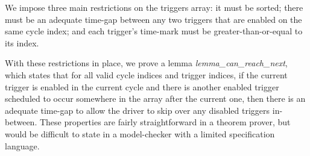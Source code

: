 
We impose three main restrictions on the triggers array: it must be sorted; there must be an adequate time-gap between any two triggers that are enabled on the same cycle index; and each trigger's time-mark must be greater-than-or-equal to its index.

With these restrictions in place, we prove a lemma \emph{lemma_can_reach_next}, which states that for all valid cycle indices and trigger indices, if the current trigger is enabled in the current cycle and there is another enabled trigger scheduled to occur somewhere in the array after the current one, then there is an adequate time-gap to allow the driver to skip over any disabled triggers in-between.
These properties are fairly straightforward in a theorem prover, but would be difficult to state in a model-checker with a limited specification language.

  
